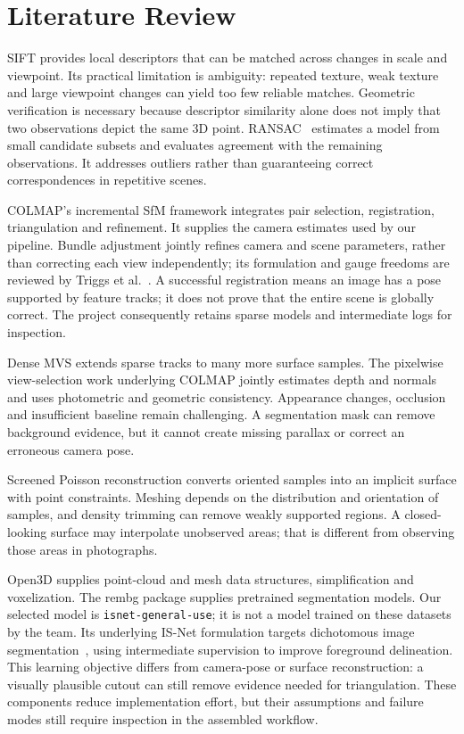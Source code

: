 \documentclass[conference]{IEEEtran}
\begin{document}
\section{Literature Review}
SIFT \cite{sift} provides local descriptors that can be matched across changes in scale and viewpoint. Its practical limitation is ambiguity: repeated texture, weak texture and large viewpoint changes can yield too few reliable matches. Geometric verification is necessary because descriptor similarity alone does not imply that two observations depict the same 3D point. RANSAC~\cite{ransac} estimates a model from small candidate subsets and evaluates agreement with the remaining observations. It addresses outliers rather than guaranteeing correct correspondences in repetitive scenes.

COLMAP's incremental SfM framework \cite{sfm} integrates pair selection, registration, triangulation and refinement. It supplies the camera estimates used by our pipeline. Bundle adjustment jointly refines camera and scene parameters, rather than correcting each view independently; its formulation and gauge freedoms are reviewed by Triggs et al.~\cite{bundle}. A successful registration means an image has a pose supported by feature tracks; it does not prove that the entire scene is globally correct. The project consequently retains sparse models and intermediate logs for inspection.

Dense MVS extends sparse tracks to many more surface samples. The pixelwise view-selection work underlying COLMAP \cite{mvs} jointly estimates depth and normals and uses photometric and geometric consistency. Appearance changes, occlusion and insufficient baseline remain challenging. A segmentation mask can remove background evidence, but it cannot create missing parallax or correct an erroneous camera pose.

Screened Poisson reconstruction \cite{poisson} converts oriented samples into an implicit surface with point constraints. Meshing depends on the distribution and orientation of samples, and density trimming can remove weakly supported regions. A closed-looking surface may interpolate unobserved areas; that is different from observing those areas in photographs.

Open3D \cite{open3d} supplies point-cloud and mesh data structures, simplification and voxelization. The rembg package \cite{rembg} supplies pretrained segmentation models. Our selected model is \texttt{isnet-general-use}; it is not a model trained on these datasets by the team. Its underlying IS-Net formulation targets dichotomous image segmentation~\cite{isnet}, using intermediate supervision to improve foreground delineation. This learning objective differs from camera-pose or surface reconstruction: a visually plausible cutout can still remove evidence needed for triangulation. These components reduce implementation effort, but their assumptions and failure modes still require inspection in the assembled workflow.
\end{document}
